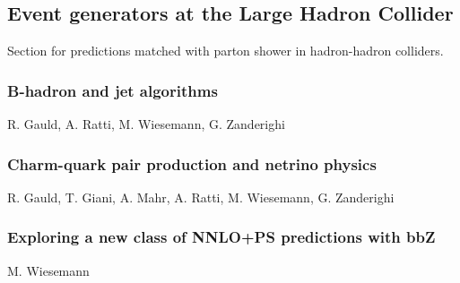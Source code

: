 \documentclass{FBR_Bericht_2025}
\begin{document}
\subsection[Event generators at the LHC]{Event generators at the Large Hadron Collider}
\begin{refsection}
Section for predictions matched with parton shower in hadron-hadron colliders.
%
\subsubsection{B-hadron and jet algorithms}
\begin{Namen}
R. Gauld, A. Ratti, M. Wiesemann, G. Zanderighi
\end{Namen}
%
\subsubsection{Charm-quark pair production and netrino physics}
\begin{Namen}
R. Gauld, T. Giani, A. Mahr, A. Ratti, M. Wiesemann, G. Zanderighi
\end{Namen}
%
\subsubsection{Exploring a new class of NNLO+PS predictions with bbZ}
\begin{Namen}
M. Wiesemann
\end{Namen}
%

\end{refsection}
\end{document}
